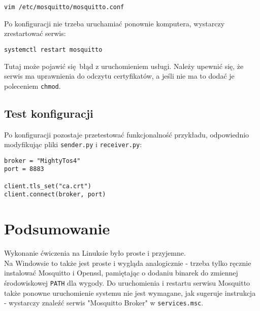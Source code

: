 \documentclass[10pt,a4paper]{article}
\begin{document}
\begin{verbatim}
vim /etc/mosquitto/mosquitto.conf
\end{verbatim}

Po konfiguracji nie trzeba uruchamiać ponownie komputera, wystarczy zrestartować serwis:

\begin{verbatim}
systemctl restart mosquitto
\end{verbatim}

Tutaj może pojawić się błąd z uruchomieniem usługi. Należy upewnić się, że serwis ma uprawnienia do odczytu certyfikatów, a jeśli nie ma to dodać je poleceniem \texttt{chmod}.

\subsection{Test konfiguracji}
Po konfiguracji pozostaje przetestować funkcjonalność przykładu, odpowiednio modyfikując pliki \texttt{sender.py} i \texttt{receiver.py}:

\begin{verbatim}
broker = "MightyTos4"
port = 8883

client.tls_set("ca.crt")
client.connect(broker, port)
\end{verbatim}

\section{Podsumowanie}
Wykonanie ćwiczenia na Linuksie było proste i przyjemne.\\
Na Windowsie to także jest proste i wygląda analogicznie - trzeba tylko ręcznie instalować Mosquitto i Openssl, pamiętając o dodaniu binarek do zmiennej środowiskowej \texttt{PATH} dla wygody. Do uruchomienia i restartu serwisu Mosquitto także ponowne uruchomienie systemu nie jest wymagane, jak sugeruje instrukcja - wystarczy znaleźć serwis "Mosquitto Broker" w \texttt{services.msc}.
\end{document}
